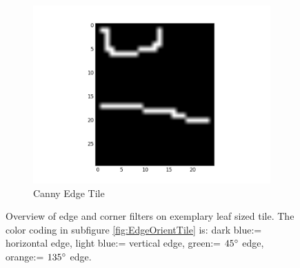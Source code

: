 \documentclass[fleqn,10pt]{SelfArx} %
\begin{document}
\begin{figure}
\begin{subfigure}[b]{0.3\textwidth}
                \includegraphics[width=\linewidth]{Figures/EdgeFigures/TileCanny.png}
                \caption{Canny Edge Tile}
                \label{fig:CannyTile}
        \end{subfigure}
        \caption{Overview of edge and corner filters on exemplary leaf sized tile. The color coding in subfigure \ref{fig:EdgeOrientTile} is: dark blue:= horizontal edge, light blue:= vertical edge, green:= $45\degree$ edge, orange:= $135\degree$ edge.}\label{fig:EdgeFilters}
\end{figure}
\end{document}
